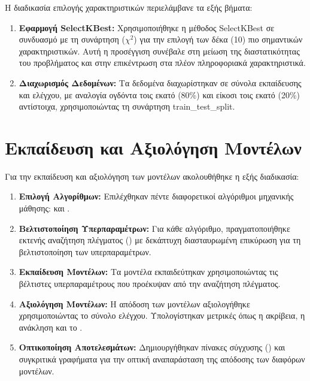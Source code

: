 Η διαδικασία επιλογής χαρακτηριστικών περιελάμβανε τα εξής βήματα:
\begin{enumerate}
  \item
    \textbf{Εφαρμογή \textlatin{SelectKBest}:} Χρησιμοποιήθηκε η μέθοδος
    \textlatin{SelectKBest} σε συνδυασμό με τη συνάρτηση (${\chi}^2$) για
    την επιλογή των δέκα (10) πιο σημαντικών χαρακτηριστικών. Αυτή η
    προσέγγιση συνέβαλε στη μείωση της διαστατικότητας του προβλήματος και
    στην επικέντρωση στα πλέον πληροφοριακά χαρακτηριστικά.

  \item
    \textbf{Διαχωρισμός Δεδομένων:} Τα δεδομένα διαχωρίστηκαν σε σύνολα
    εκπαίδευσης και ελέγχου, με αναλογία ογδόντα τοις εκατό (80\%) και
    είκοσι τοις εκατό (20\%) αντίστοιχα, χρησιμοποιώντας τη συνάρτηση
    \textlatin{train\_test\_split}.
\end{enumerate}

\section{Εκπαίδευση και Αξιολόγηση Μοντέλων}

Για την εκπαίδευση και αξιολόγηση των μοντέλων ακολουθήθηκε η εξής
διαδικασία:
\begin{enumerate}
  \item
    \textbf{Επιλογή Αλγορίθμων:} Επιλέχθηκαν πέντε διαφορετικοί
    αλγόριθμοι μηχανικής μάθησης:  και .
  \item
    \textbf{Βελτιστοποίηση Υπερπαραμέτρων:} Για κάθε αλγόριθμο,
    πραγματοποιήθηκε εκτενής αναζήτηση πλέγματος () με
    δεκάπτυχη διασταυρωμένη επικύρωση για τη βελτιστοποίηση των
    υπερπαραμέτρων.
  \item
    \textbf{Εκπαίδευση Μοντέλων:} Τα μοντέλα εκπαιδεύτηκαν χρησιμοποιώντας
    τις βέλτιστες υπερπαραμέτρους που προέκυψαν από την αναζήτηση
    πλέγματος.
  \item
    \textbf{Αξιολόγηση Μοντέλων:} Η απόδοση των μοντέλων αξιολογήθηκε
    χρησιμοποιώντας το σύνολο ελέγχου. Υπολογίστηκαν μετρικές όπως η
    ακρίβεια, η ανάκληση και το .
  \item
    \textbf{Οπτικοποίηση Αποτελεσμάτων:} Δημιουργήθηκαν πίνακες σύγχυσης
    () και συγκριτικά γραφήματα για την οπτική
    αναπαράσταση της απόδοσης των διαφόρων μοντέλων.
\end{enumerate}

